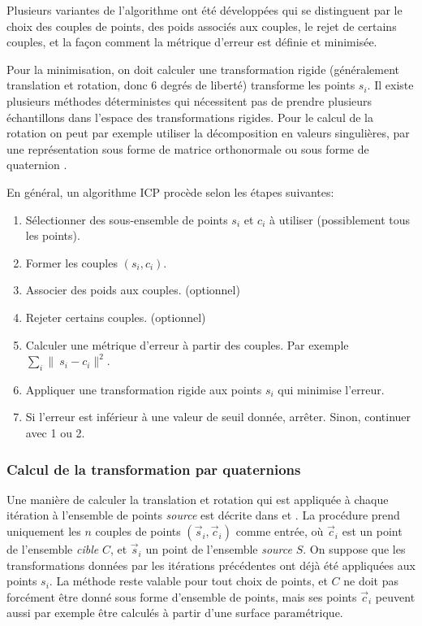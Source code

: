 \documentclass[a4paper,10pt]{scrreprt}
\begin{document}
Plusieurs variantes de l'algorithme ont été développées qui se distinguent par le choix des couples de points, des poids associés aux couples, le rejet de certains couples, et la façon comment la métrique d'erreur est définie et minimisée. \cite{Rusi2001}

Pour la minimisation, on doit calculer une transformation rigide (généralement translation et rotation, donc 6 degrés de liberté) transforme les points $s_i$. Il existe plusieurs méthodes déterministes qui nécessitent pas de prendre plusieurs échantillons dans l'espace des transformations rigides. Pour le calcul de la rotation on peut par exemple utiliser la décomposition en valeurs singulières, par une représentation sous forme de matrice orthonormale ou sous forme de quaternion \cite{Horn1986}.

En général, un algorithme ICP procède selon les étapes suivantes:
\begin{enumerate}
	\item Sélectionner des sous-ensemble de points ${s_i}$ et ${c_i}$ à utiliser (possiblement tous les points).
	\item Former les couples $(s_i, c_i)$.
	\item Associer des poids aux couples. (optionnel)
	\item Rejeter certains couples. (optionnel)
	\item Calculer une métrique d'erreur à partir des couples. Par exemple $\sum_{i} \|\ s_i - c_i \|^2$.
	\item Appliquer une transformation rigide aux points ${s_i}$ qui minimise l'erreur.
	\item Si l'erreur est inférieur à une valeur de seuil donnée, arrêter. Sinon, continuer avec 1 ou 2. 
\end{enumerate}


\subsubsection{Calcul de la transformation par quaternions} \label{sec:quat_trans}
Une manière de calculer la translation et rotation qui est appliquée à chaque itération à l'ensemble de points \emph{source} est décrite dans \cite{Besl1992} et \cite{Horn1986}. La procédure prend uniquement les $n$ couples de points $(\vec{s}_i, \vec{c}_i)$ comme entrée, où $\vec{c}_i$ est un point de l'ensemble \emph{cible} $C$, et $\vec{s}_i$ un point de l'ensemble \emph{source} $S$. On suppose que les transformations données par les itérations précédentes ont déjà été appliquées aux points $s_i$. La méthode reste valable pour tout choix de points, et $C$ ne doit pas forcément être donné sous forme d'ensemble de points, mais ses points $\vec{c}_i$ peuvent aussi par exemple être calculés à partir d'une surface paramétrique.
\end{document}
